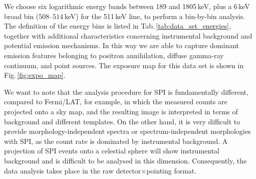 \documentclass[doublespace,nopageskip]{VTthesis}
\begin{document}
We choose six logarithmic energy bands between 189 and 1805\,keV, plus a 6\,keV broad bin ($508$--$514$\,keV) for the 511\,keV line, to perform a bin-by-bin analysis. The definition of the energy bins is listed in Tab.\,\ref{tab:data_set_energies}, together with additional characteristics concerning instrumental background and potential emission mechanisms.
%
In this way we are able to capture dominant emission features belonging to positron annihilation, diffuse gamma-ray continuum, and point sources. The exposure map for this data set is shown in Fig.\,\ref{fig:expo_map}.

%

%
%

We want to note that the analysis procedure for SPI is fundamentally different, compared to Fermi/LAT, for example, in which the measured counts are projected onto a sky map, and the resulting image is interpreted in terms of background and different templates.
%
On the other hand, it is very difficult to provide morphology-independent spectra or spectrum-independent morphologies with SPI, as the count rate is dominated by instrumental background.
%
A projection of SPI events onto a celestial sphere will show instrumental background and is difficult to be analysed in this dimension.
%
Consequently, the data analysis takes place in the raw detector$\times$pointing format.
\end{document}
